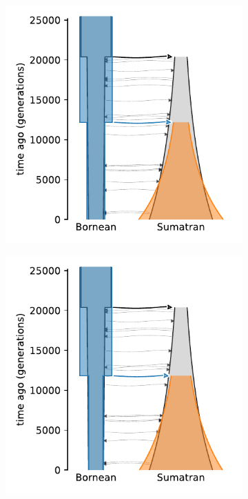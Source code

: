 \begin{figure}[ht]
\begin{subfigure}[b]{0.24\linewidth}
        \includegraphics[width=\textwidth]{images_experiments/suimulation_2_stdpopsim/ORAN-STRUCT-NOMIG/moments.pdf}
        \caption{}
        \label{fig:part2:experiments:sim2:results:oran_struct_nomig_moments}
    \end{subfigure}%
    \begin{subfigure}[b]{0.24\linewidth}
        \centering
        \includegraphics[width=\textwidth]{images_experiments/suimulation_2_stdpopsim/ORAN-STRUCT-NOMIG/momi.pdf}

\end{subfigure}
\end{figure}
